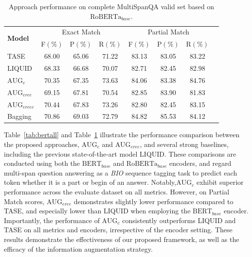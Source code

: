 \documentclass[a4paper,fleqn]{cas-dc}
\newcommand{\1}[1]{\mathds{1}\left[#1\right]}
\begin{document}
	\begin{table}[width=\textwidth,cols=8,pos=h]  
		\caption{Approach performance on complete MultiSpanQA valid set based on $\text{RoBERTa}_{base}$.} 
		\label{tab:robertaall}
		\begin{tabular*}{\textwidth}{p{1.5cm}ccccccc}
			\toprule
			\multirow{2}{*}{\textbf{Model}} & \multicolumn{3}{c}{Exact Match} & \multicolumn{3}{c}{Partial Match}  \\
			\cline{2-7} 
			\addlinespace
			& F\((\%)\) & P\((\%)\) & R\((\%)\) & F\((\%)\) & P\((\%)\) & R\((\%)\) \\
			\midrule
			TASE & 68.00 & 65.06 & 71.22 & 83.13 & 83.05 & 83.22 \\ 
			LIQUID & 68.33 & 66.68 & 70.07 & 82.71 & 82.45 & 82.98 \\
			$\text{AUG}_{c}$ & 70.35 & 67.35 & 73.63 & 84.06 & 83.38 & 84.76 \\
			$\text{AUG}_{eree}$ & 69.15 & 67.81 & 70.54 & 82.85 & 83.90 & 81.83 \\
			$\text{AUG}_{ereec}$ & 70.44 & 67.83 & 73.26 & 82.80 & 82.45 & 83.15 \\
			Bagging & 70.86 & 69.03 & 72.79 & 84.82 & 85.53 & 84.12 \\
			\bottomrule
		\end{tabular*}      
	\end{table}
	Table~\ref{tab:bertall} and Table~\ref{tab:robertaall} illustrate the performance comparison between the proposed approaches, $\text{AUG}_{c}$ and $\text{AUG}_{eree}$, and several strong baselines, including the previous state-of-the-art model LIQUID. These comparisons are conducted using both the $\text{BERT}_{base}$ and $\text{RoBERTa}_{base}$ encoders, and regard multi-span question answering as a \textit{BIO} sequence tagging task to predict each token whether it is a part or begin of an answer. 
	Notably,$\text{AUG}_{c}$ exhibit superior performance across the evaluate dataset on all metrics. However, on Partial Match scores, $\text{AUG}_{eree}$ demonstrates slightly lower performance compared to TASE, and especially lower than LIQUID when employing the $\text{BERT}_{base}$ encoder.
	Importantly, the performance of $\text{AUG}_{c}$ consistently outperforms LIQUID and TASE on all metrics and encoders, irrespective of the encoder setting.
	These results demonstrate the effectiveness of our proposed framework, as well as the efficacy of the information augmentation strategy.
	 
\end{document}
